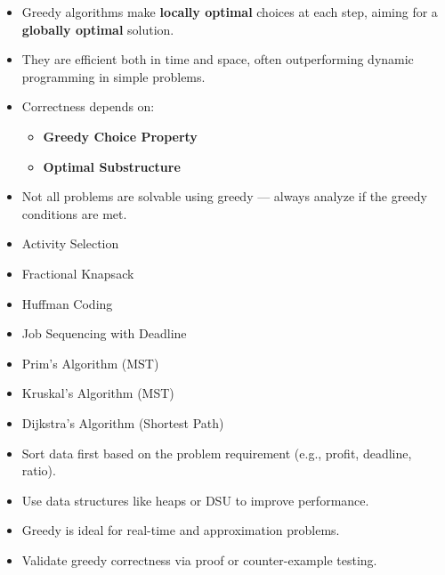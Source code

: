 \documentclass[14pt]{extarticle}
\begin{document}
\begin{tcolorbox}[colback=white, colframe=black, title=What You Should Know About Greedy Algorithms]
\begin{itemize}
    \item Greedy algorithms make \textbf{locally optimal} choices at each step, aiming for a \textbf{globally optimal} solution.
    \item They are efficient both in time and space, often outperforming dynamic programming in simple problems.
    \item Correctness depends on:
    \begin{itemize}
        \item \textbf{Greedy Choice Property}
        \item \textbf{Optimal Substructure}
    \end{itemize}
    \item Not all problems are solvable using greedy — always analyze if the greedy conditions are met.
\end{itemize}
\end{tcolorbox}

\vspace{0.5cm}

\begin{tcolorbox}[colback=white, colframe=black, title=Key Problems Solved Using Greedy]
\begin{multicols}{2}
\begin{itemize}[leftmargin=*, noitemsep]
    \item Activity Selection
    \item Fractional Knapsack
    \item Huffman Coding
    \item Job Sequencing with Deadline
    \item Prim's Algorithm (MST)
    \item Kruskal's Algorithm (MST)
    \item Dijkstra's Algorithm (Shortest Path)
\end{itemize}
\end{multicols}
\end{tcolorbox}

\vspace{0.5cm}

\begin{tcolorbox}[colback=white, colframe=black, title=Tips]
\begin{itemize}
    \item Sort data first based on the problem requirement (e.g., profit, deadline, ratio).
    \item Use data structures like heaps or DSU to improve performance.
    \item Greedy is ideal for real-time and approximation problems.
    \item Validate greedy correctness via proof or counter-example testing.
\end{itemize}
\end{tcolorbox}
\end{document}
